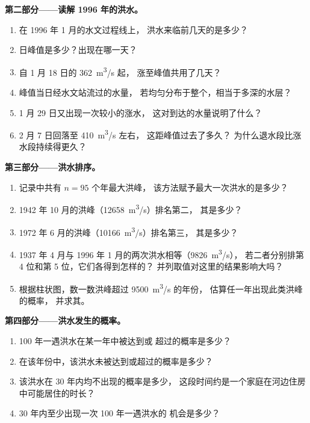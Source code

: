 \begin{problem}
\medskip
\noindent\textbf{第二部分——读解 1996 年的洪水。}
\begin{enumerate}[resume]
  \item 在 1996 年 1 月的水文过程线上，
        洪水来临前几天的是多少？
  \item 日峰值是多少？出现在哪一天？
  \item 自 1 月 18 日的 \qty{362}{m^3/s} 起，
        涨至峰值共用了几天？
  \item 峰值当日经水文站流过的水量，
        若均匀分布于整个，相当于多深的水层？
  \item 1 月 29 日又出现一次较小的涨水，
        这对到达的水量说明了什么？
  \item 2 月 7 日回落至 \qty{410}{m^3/s} 左右，
        这距峰值过去了多久？
        为什么退水段比涨水段持续得更久？
\end{enumerate}

\medskip
\noindent\textbf{第三部分——洪水排序。}
\begin{enumerate}[resume]
  \item 记录中共有 $n = 95$ 个年最大洪峰，
        该方法赋予最大一次洪水的是多少？
  \item 1942 年 10 月的洪峰（\qty{12658}{m^3/s}）排名第二，
        其是多少？
  \item 1972 年 6 月的洪峰（\qty{10166}{m^3/s}）排名第三，
        其是多少？
  \item 1937 年 4 月与 1996 年 1 月的两次洪水相等（\qty{9826}{m^3/s}），
        若二者分别排第 4 位和第 5 位，它们各得到怎样的？
        并列取值对这里的结果影响大吗？
  \item 根据柱状图，数一数洪峰超过 \qty{9500}{m^3/s} 的年份，
        估算任一年出现此类洪峰的概率，
        并求其。
\end{enumerate}

\medskip
\noindent\textbf{第四部分——洪水发生的概率。}
\begin{enumerate}[resume]
  \item \num{100} 年一遇洪水在某一年中被达到或
        超过的概率是多少？
  \item 在该年份中，该洪水未被达到或超过的概率是多少？
  \item 该洪水在 \num{30} 年内均不出现的概率是多少，
        这段时间约是一个家庭在河边住房中可能居住的时长？
  \item \num{30} 年内至少出现一次 \num{100} 年一遇洪水的
        机会是多少？
\end{enumerate}
\end{problem}
